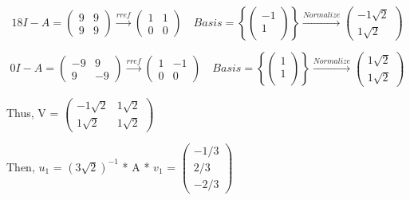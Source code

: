 \documentclass{article}
\newcommand{\sbreak}{\vspace{10pt}}
\begin{document}
\[18I - A = \begin{pmatrix}
    9 & 9\\
    9 & 9
\end{pmatrix} \xrightarrow{rref} \begin{pmatrix}
    1 & 1 \\
    0 & 0
\end{pmatrix}\quad Basis = \left\{
    \begin{pmatrix}
        -1 \\
        1\\
    \end{pmatrix}\right\}\xrightarrow{Normalize} \begin{pmatrix}
        -1\sqrt{2}\\
        1\sqrt{2}
    \end{pmatrix}
\]

\[0I - A = \begin{pmatrix}
    -9 & 9\\
    9 & -9
\end{pmatrix} \xrightarrow{rref} \begin{pmatrix}
    1 & -1 \\
    0 & 0
\end{pmatrix}\quad Basis = \left\{
    \begin{pmatrix}
        1 \\
        1\\
    \end{pmatrix}\right\}\xrightarrow{Normalize} \begin{pmatrix}
        1\sqrt{2}\\
        1\sqrt{2}
    \end{pmatrix}
\]

Thus, V = $\begin{pmatrix}
    -1\sqrt{2} & 1\sqrt{2} \\
    1\sqrt{2} & 1\sqrt{2}
\end{pmatrix}$

\sbreak

Then, $u_1$ = $(3\sqrt{2})^{-1}$ * A * $v_1$ = $\begin{pmatrix}
    -1/3\\
    2/3\\
    -2/3
\end{pmatrix}$
\end{document}
